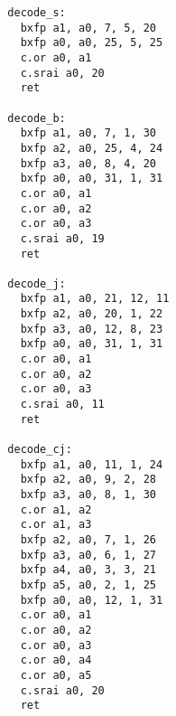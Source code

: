 \begin{multicols}{2}
\begin{verbatim}
  decode_s:
    bxfp a1, a0, 7, 5, 20
    bxfp a0, a0, 25, 5, 25
    c.or a0, a1
    c.srai a0, 20
    ret

  decode_b:
    bxfp a1, a0, 7, 1, 30
    bxfp a2, a0, 25, 4, 24
    bxfp a3, a0, 8, 4, 20
    bxfp a0, a0, 31, 1, 31
    c.or a0, a1
    c.or a0, a2
    c.or a0, a3
    c.srai a0, 19
    ret

  decode_j:
    bxfp a1, a0, 21, 12, 11
    bxfp a2, a0, 20, 1, 22
    bxfp a3, a0, 12, 8, 23
    bxfp a0, a0, 31, 1, 31
    c.or a0, a1
    c.or a0, a2
    c.or a0, a3
    c.srai a0, 11
    ret

  decode_cj:
    bxfp a1, a0, 11, 1, 24
    bxfp a2, a0, 9, 2, 28
    bxfp a3, a0, 8, 1, 30
    c.or a1, a2
    c.or a1, a3
    bxfp a2, a0, 7, 1, 26
    bxfp a3, a0, 6, 1, 27
    bxfp a4, a0, 3, 3, 21
    bxfp a5, a0, 2, 1, 25
    bxfp a0, a0, 12, 1, 31
    c.or a0, a1
    c.or a0, a2
    c.or a0, a3
    c.or a0, a4
    c.or a0, a5
    c.srai a0, 20
    ret
\end{verbatim}
\end{multicols}
